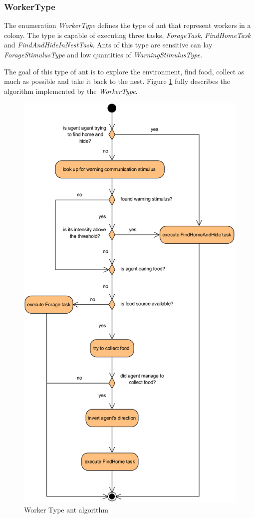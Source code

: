 \subsubsection{WorkerType}

The enumeration \emph{WorkerType} defines the type of ant that represent workers in a colony. The type is capable of executing three tasks, \emph{ForageTask}, \emph{FindHomeTask} and \emph{FindAndHideInNestTask}. Ants of this type are sensitive can lay \emph{ForageStimulusType} and low quantities of \emph{WarningStimulusType}. 

The goal of this type of ant is to explore the environment, find food,  collect as much as possible and take it back to the nest. Figure \ref{fig:worker-type} fully describes the algorithm implemented by the \emph{WorkerType}.

\begin{figure}[H]
  \centering
  \includegraphics[width=0.8\linewidth]{gfx/uml-worker-type.png}
  \caption{Worker Type ant algorithm}
  \label{fig:worker-type}
\end{figure}

